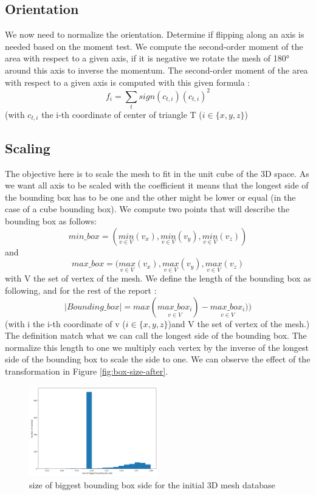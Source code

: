 \documentclass[10pt,twocolumn,letterpaper]{article}
\begin{document}
\subsection{Orientation}
	We now need to normalize the orientation. Determine if flipping along an axis is needed based on the moment test. We compute the second-order moment of the area with respect to a given axis, if it is negative we rotate the mesh of 180° around this axis to inverse the momentum.
	The second-order moment of the area with respect to a given axis is computed with this given formula :
	$$ f_i = \sum_{t} sign(c_{t,i})(c_{t,i})^2  $$ (with $c_{t,i}$ the i-th coordinate of center of triangle T ($i \in \{x,y,z\}$)
	

\subsection{Scaling}
	The objective here is to scale the mesh to fit in the unit cube of the 3D space. As we want all axis to be scaled with the coefficient it means that the longest side of the bounding box has to be one and the other might be lower or equal (in the case of a cube bounding box).
	We compute two points that will describe the bounding box as follows:
	$$min\_box = (\underset{v \in V}{min}(v_x),\underset{v \in V}{min}(v_y),\underset{v \in V}{min}(v_z)) $$ and $$max\_box = (\underset{v \in V}{max}(v_x), \underset{v \in V}{max}(v_y), \underset{v \in V}{max}(v_z)$$ with V the set of vertex of the mesh.
	We define the length of the bounding box as following, and for the rest of the report :
	$$ |Bounding\_box| = max(\underset{v \in V}{max\_box_i}) - \underset{v \in V}{max\_box_i}))$$ (with i the i-th coordinate of v ($i \in \{x,y,z\}$)and V the set of vertex of the mesh.)
	The definition match what we can call the longest side of the bounding box. The normalize this length to one we multiply each vertex by the inverse of the longest side of the bounding box to scale the side to one. We can observe the effect of the transformation in Figure \ref{fig:box-size-after}.

\begin{figure}[h!]
\begin{center}
  \includegraphics[width=0.5\textwidth]{picture/Initial size of biggest bounding box side}
  \caption{size of biggest bounding box side for the initial 3D mesh database}
  \label{fig:box-size-before}
  \end{center}
\end{figure}
\end{document}
